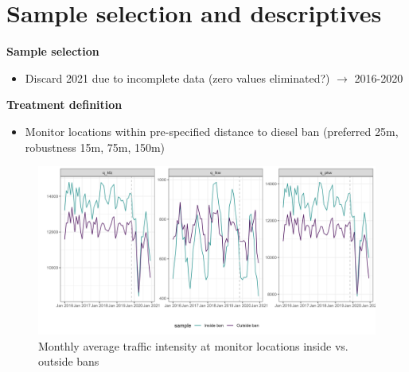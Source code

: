\documentclass[a4paper, 10pt]{article}
\begin{document}
\clearpage\FloatBarrier
\section{Sample selection and descriptives}

\noindent \textbf{Sample selection}
\begin{itemize}
	\item Discard 2021 due to incomplete data (zero values eliminated?) $\rightarrow$ 2016-2020
\end{itemize}

\vspace{0.5cm}
\noindent \textbf{Treatment definition}
\begin{itemize}
	\item Monitor locations within pre-specified distance to diesel ban (preferred 25m, robustness 15m, 75m, 150m)
\end{itemize}


%
%
%

\begin{figure}[H]
\centering
\caption{Monthly average traffic intensity at monitor locations inside vs. outside bans}
\includegraphics[width = \textwidth]{../04_figures/monthly_unrestricted.png} 
\end{figure}

\clearpage
\end{document}
